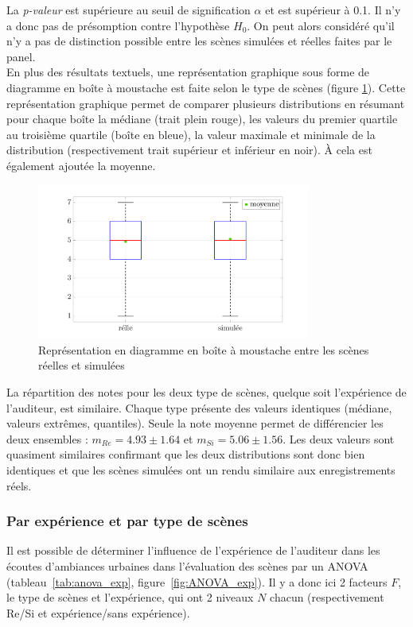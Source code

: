 La \textit{p-valeur} est supérieure au seuil de signification $\alpha$ et est supérieur à 0.1. Il n'y a donc pas de présomption contre l'hypothèse $H_0$. On peut alors considéré qu'il n'y a pas de distinction possible entre les scènes simulées et réelles faites par le panel. \\

En plus des résultats textuels, une représentation graphique sous forme de diagramme en boîte à moustache est faite selon le type de scènes (figure \ref{fig:ANOVA_scene}). Cette représentation graphique permet de comparer plusieurs distributions en résumant pour chaque boîte la médiane (trait plein rouge), les valeurs du  premier quartile au troisième quartile (boîte en bleue), la valeur maximale et minimale de la distribution (respectivement trait supérieur et inférieur en noir). \`A cela est également ajoutée la moyenne.\\

\begin{figure}[h]
\centering
\includegraphics[width = 0.8\textwidth]{./figures/test_perceptif/testPerceptif_boxplotType_FR.png}
\caption{Représentation en diagramme en boîte à moustache entre les scènes réelles et simulées}\label{fig:ANOVA_scene}
\end{figure}

La répartition des notes pour les deux type de scènes, quelque soit l'expérience de l'auditeur, est similaire. Chaque type présente des valeurs identiques (médiane, valeurs extrêmes, quantiles). Seule la note moyenne permet de différencier les deux ensembles : $m_{Re} = 4.93 \pm 1.64$ et $m_{Si} = 5.06 \pm 1.56$. Les deux valeurs sont quasiment similaires confirmant que les deux distributions sont donc bien identiques et que les scènes simulées ont un rendu similaire aux enregistrements réels. \\

\subsubsection{Par expérience et par type de scènes}
Il est possible de déterminer l'influence de l'expérience de l'auditeur dans les écoutes d'ambiances urbaines dans l'évaluation des scènes par un ANOVA (tableau~\ref{tab:anova_exp}, figure~\ref{fig:ANOVA_exp}). Il y a donc ici 2 facteurs $F$, le type de scènes et l'expérience, qui ont 2 niveaux $N$ chacun (respectivement Re/Si et expérience/sans expérience).


